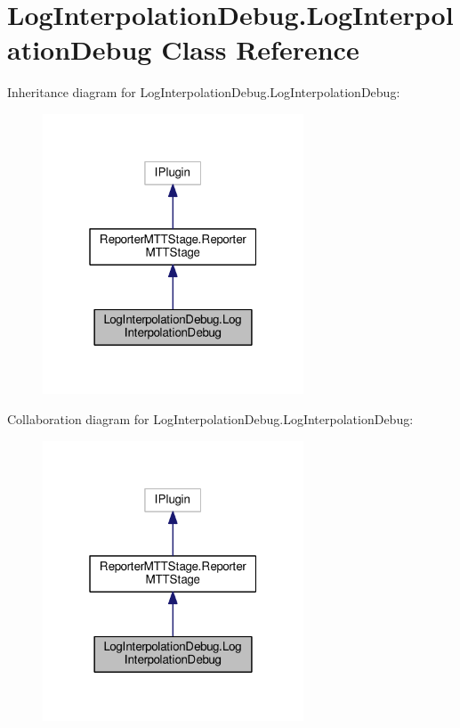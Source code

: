 \hypertarget{class_log_interpolation_debug_1_1_log_interpolation_debug}{\section{Log\-Interpolation\-Debug.\-Log\-Interpolation\-Debug Class Reference}
\label{class_log_interpolation_debug_1_1_log_interpolation_debug}
}


Inheritance diagram for Log\-Interpolation\-Debug.\-Log\-Interpolation\-Debug\-:
\nopagebreak
\begin{figure}[H]
\begin{center}
\leavevmode
\includegraphics[width=220pt]{class_log_interpolation_debug_1_1_log_interpolation_debug__inherit__graph}
\end{center}
\end{figure}


Collaboration diagram for Log\-Interpolation\-Debug.\-Log\-Interpolation\-Debug\-:
\nopagebreak
\begin{figure}[H]
\begin{center}
\leavevmode
\includegraphics[width=220pt]{class_log_interpolation_debug_1_1_log_interpolation_debug__coll__graph}
\end{center}
\end{figure}
